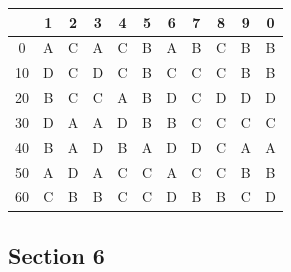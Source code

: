 \documentclass[11pt,a4paper]{article}
\begin{document}
\begin{tabular}{ | c | c c c c c c c c c c | }
\hline
 & 1 & 2 & 3 & 4 & 5 & 6 & 7 & 8 & 9 & 0 \\
\hline
0 & A & C & A & C & B & A & B & C & B & B \\
10 & D & C & D & C & B & C & C & C & B & B \\
20 & B & C & C & A & B & D & C & D & D & D \\
30 & D & A & A & D & B & B & C & C & C & C \\
40 & B & A & D & B & A & D & D & C & A & A \\
50 & A & D & A & C & C & A & C & C & B & B \\
60 & C & B & B & C & C & D & B & B & C & D \\
\hline
\end{tabular}
\clearpage
\subsection*{Section 6}
\end{document}
